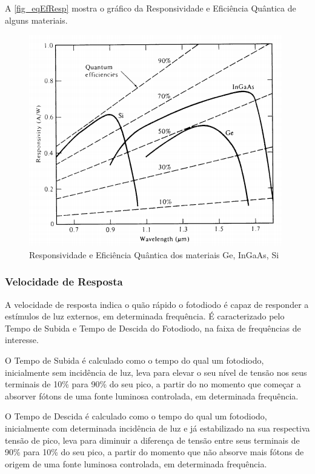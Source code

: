 A \autoref{fig_eqEfResp} mostra o gráfico da Responsividade e Efici\^encia Qu\^antica de alguns materiais.

\begin{figure}[!h]
	\caption{\label{fig_responsividade}Responsividade e Efici\^encia Qu\^antica dos materiais Ge, InGaAs, Si}
	\begin{center}
	    \includegraphics[scale=0.5]{Imagens/GraficoRespostaEspectral.png}
	\end{center}
	\label{fig_eqEfResp}
\end{figure}


\subsubsection{Velocidade de Resposta}
A velocidade de resposta indica o quão rápido o fotodiodo \'e capaz de responder a estímulos de luz externos, em determinada frequência. É caracterizado pelo Tempo de Subida e Tempo de Descida do Fotodiodo, na faixa de frequências de interesse.

O Tempo de Subida \'e calculado como o tempo do qual um fotodiodo, inicialmente sem incidência de luz, leva para elevar o seu nível de tensão nos seus terminais de 10\% para 90\% do seu pico, a partir do no momento que começar a absorver fótons de uma fonte luminosa controlada, em determinada frequência.

O Tempo de Descida \'e calculado como o tempo do qual um fotodiodo, inicialmente com determinada incidência de luz e já estabilizado na sua respectiva tensão de pico, leva para diminuir a diferença de tensão entre seus terminais de 90\% para 10\% do seu pico, a partir do momento que não absorve mais fótons de origem de uma fonte luminosa controlada, em determinada frequência.

